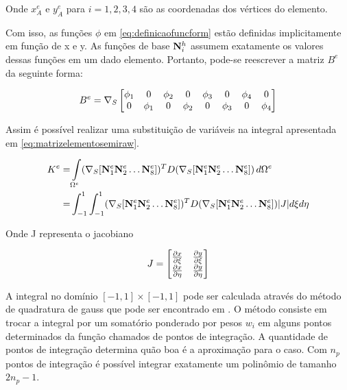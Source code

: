 Onde $x^e_A$ e $y^e_A$ para $i=1,2,3,4$ são as coordenadas dos vértices do elemento.

Com isso, as funções $\phi$ em \eqref{eq:definicaofuncform} estão definidas implicitamente em função de x e y. As funções de base $\basefunctionfine$ assumem exatamente os valores dessas funções em um dado elemento. Portanto, pode-se reescrever a matriz $B^e$ da seguinte forma:


\begin{equation} \label{eq:bephi}
    B^e = \sopnabla \begin{bmatrix}
\phi_1 & 0      & \phi_2 & 0 & \phi_3 & 0 & \phi_4 & 0\\
0      & \phi_1 & 0 & \phi_2 & 0 & \phi_3 & 0 & \phi_4
\end{bmatrix}
\end{equation}


Assim é possível realizar uma substituição de variáveis na integral apresentada em \eqref{eq:matrizelementosemiraw}.


\begin{align}
K^e      = & \omeeint{ (\sopnabla [\basefunctionelem[1] \basefunctionelem[2] \hdots \basefunctionelem[8] ]) ^T D (\sopnabla [\basefunctionelem[1] \basefunctionelem[2] \hdots \basefunctionelem[8]])}   \nonumber\\
         = &  \intbase{(\sopnabla [\basefunctionelem[1] \basefunctionelem[2] \hdots \basefunctionelem[8] ]) ^T D (\sopnabla [\basefunctionelem[1] \basefunctionelem[2] \hdots \basefunctionelem[8]]) |J| \label{eq:matrizelemento} }
\end{align}


Onde J representa o jacobiano

\begin{equation}
J = \begin{bmatrix}
\dxi[x]   &  \dxi[y]    \\
\deta[x]  &  \deta[y]
\end{bmatrix}
\label{eq:jacobiano}
\end{equation}


A integral no domínio $[-1, 1] \times [-1,1] $ pode ser calculada através do método de quadratura de gauss que pode ser encontrado em \cite{jacob}. O método consiste em trocar a integral por um somatório ponderado por pesos $w_i$ em alguns pontos determinados da função chamados de pontos de integração. A quantidade de pontos de integração determina quão boa é a aproximação para o caso. Com $n_p$ pontos de integração é possível integrar exatamente um
polinômio de tamanho $2n_p - 1$. %

